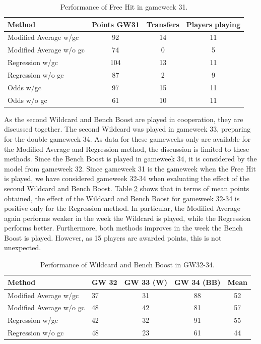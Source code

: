 \begin{table}[H]
\centering
\begin{tabular}{@{}lccc@{}}
\toprule
Method                  & Points GW31 & Transfers  & Players playing \\ \midrule
Modified Average w/gc   & 92          & 14         & 11              \\
Modified Average w/o gc & 74          & 0  & 5               \\
Regression w/gc         & 104         & 13         & 11              \\
Regression w/o gc       & 87          & 2  & 9               \\
Odds w/gc               & 97          & 15         & 11              \\
Odds w/o gc             & 61          & 10  & 11              \\ \bottomrule
\end{tabular}
\caption{Performance of Free Hit in gameweek 31.}
\label{tab:performance_free_hit}
\end{table}


\newpar

As the second Wildcard and Bench Boost are played in cooperation, they are discussed together. The second Wildcard was played in gameweek 33, preparing for the double gameweek 34. As data for these gameweeks only are available for the Modified Average and Regression method, the discussion is limited to these methods. Since the Bench Boost is played in gameweek 34, it is considered by the model from gameweek 32. Since gameweek 31 is the gameweek when the Free Hit is played, we have considered gameweek 32-34 when evaluating the effect of the second Wildcard and Bench Boost. Table \ref{tab:performance_wildcard_and_bench_boost} shows that in terms of mean points obtained, the effect of the Wildcard and Bench Boost for gameweek 32-34 is positive only for the Regression method. In particular, the Modified Average again performs weaker in the week the Wildcard is played, while the Regression performs better. Furthermore, both methods improves in the week the Bench Boost is played. However, as 15 players are awarded points, this is not unexpected.


\begin{table}[H]
\centering
\begin{tabular}{@{}llccc@{}}
\toprule
Method                  & GW 32 & GW 33 (W) & GW 34 (BB) & Mean \\ \midrule
Modified Average w/gc   & 37    & 31        & 88         & 52   \\
Modified Average w/o gc & 48    & 42        & 81         & 57   \\
Regression w/gc         & 42    & 32        & 91         & 55   \\
Regression w/o gc       & 48    & 23        & 61         & 44   \\ \bottomrule
\end{tabular}
\caption{Performance of Wildcard and Bench Boost in GW32-34.}
\label{tab:performance_wildcard_and_bench_boost}
\end{table}


